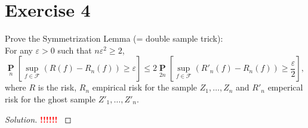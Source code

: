 \documentclass[10pt, a4paper, twoside]{amsart}
\theoremstyle{plain}
\renewcommand{\P}{\operatorname*{\ensuremath{\mathbf{P}}}} %
\newenvironment{solution}
               {\let\oldqedsymbol=\qedsymbol
                \renewcommand{\qedsymbol}{$\blacktriangleleft$}
                \begin{proof}[Solution]}
               {\end{proof}
                \renewcommand{\qedsymbol}{\oldqedsymbol}}
\newcommand{\TODO}{\textcolor{red}{\textbf{!!!!!! }}}
\begin{document}
\section*{Exercise 4}
Prove the Symmetrization Lemma (= double sample trick):\\
For any $\varepsilon >0$ such that $n \varepsilon^2 \geq 2$,
\begin{equation*}
  \P_n\left[ \sup_{f \in \mathcal{F}} (R(f) - R_n(f)) \geq \varepsilon \right] \leq 2 \P_{2n}\left[ \sup_{f \in \mathcal{F}} (R'_n(f) - R_n(f)) \geq \frac{\varepsilon}{2} \right],
\end{equation*}
where $R$ is the risk, $R_n$ empirical risk for the sample $Z_1, \ldots, Z_n$ and $R'_n$ emperical risk for the ghost sample $Z'_1, \ldots , Z'_n$.
 \begin{solution}
\TODO
 \end{solution}
\end{document}
